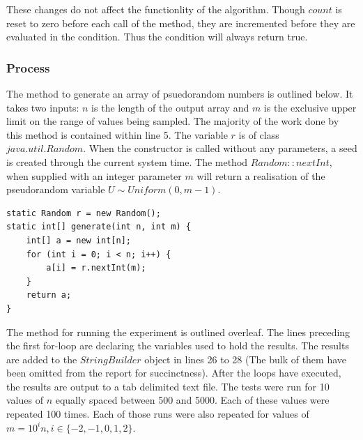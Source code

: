 \documentclass{article}
\begin{document}
These changes do not affect the functionlity of the algorithm. Though $count$ is reset to zero before each call of the method, they are incremented before they are evaluated in the condition. Thus the condition will always return true.
 
\pagebreak

\subsubsection{Process}
The method to generate an array of psuedorandom numbers is outlined below. It takes two inputs: $n$ is the length of the output array and $m$ is the exclusive upper limit on the range of values being sampled. The majority of the work done by this method is contained within line 5. The variable $r$ is of class $java.util.Random$. When the constructor is called without any parameters, a seed is created through the current system time. The method $Random::nextInt$, when supplied with an integer parameter $m$ will return a realisation of the pseudorandom variable $U \sim Uniform(0, m-1)$.
\begin{lstlisting}
static Random r = new Random();
static int[] generate(int n, int m) {
	int[] a = new int[n];
	for (int i = 0; i < n; i++) {
		a[i] = r.nextInt(m); 
	}
	return a;
}
\end{lstlisting}

The method for running the experiment is outlined overleaf. The lines preceding the first for-loop are declaring the variables used to hold the results. The results are added to the $StringBuilder$ object in lines 26 to 28 (The bulk of them have been omitted from the report for succinctness). After the loops have executed, the results are output to a tab delimited text file. The tests were run for 10 values of $n$ equally spaced between 500 and 5000. Each of these values were repeated 100 times. Each of those runs were also repeated for values of $m=10^in, i\in\{-2, -1, 0, 1, 2\}$.

\pagebreak
\end{document}
